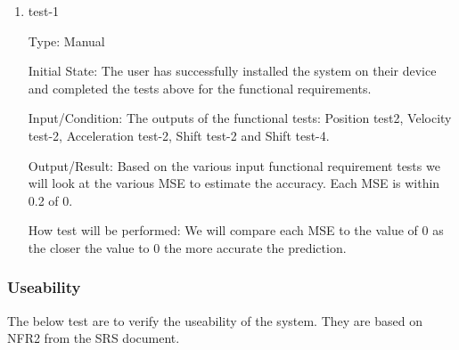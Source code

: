 \documentclass[12pt, titlepage]{article}
\begin{document}
\begin{enumerate}

\item{test-1\\}

Type: Manual
					
Initial State: The user has successfully installed the system on their device and completed the tests above for the functional requirements.
					
Input/Condition: The outputs of the functional tests: Position test2, Velocity test-2, Acceleration test-2, Shift test-2 and Shift test-4. 
					
Output/Result: Based on the various input functional requirement tests we will look at the various MSE to estimate the accuracy. 
Each MSE is within 0.2 of 0.
					
How test will be performed: We will compare each MSE to the value of 0 as the closer the value to 0 the more accurate the prediction.

\end{enumerate}

\subsubsection{Useability}

The below test are to verify the useability of the system.
They are based on NFR2 from the SRS document.
\end{document}

